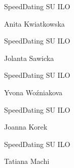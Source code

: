\documentclass[a4paper,12pt]{article}
\begin{document}
\begin{minipage}[c]{\textwidth}
  \hline

  \hspace{0.5cm}

  SpeedDating SU ILO

  Anita Kwiatkowska

  \hspace{0.5cm}

  \hline
\end{minipage}



\begin{minipage}[c]{\textwidth}
  \hline

  \hspace{0.5cm}

  SpeedDating SU ILO

  Jolanta Sawicka

  \hspace{0.5cm}

  \hline
\end{minipage}



\begin{minipage}[c]{\textwidth}
  \hline

  \hspace{0.5cm}

  SpeedDating SU ILO

  Yvona Woźniakova

  \hspace{0.5cm}

  \hline
\end{minipage}



\begin{minipage}[c]{\textwidth}
  \hline

  \hspace{0.5cm}

  SpeedDating SU ILO

  Joanna Korek

  \hspace{0.5cm}

  \hline
\end{minipage}



\begin{minipage}[c]{\textwidth}
  \hline

  \hspace{0.5cm}

  SpeedDating SU ILO

  Tatiana Machi

  \hspace{0.5cm}

  \hline
\end{minipage}
\end{document}
